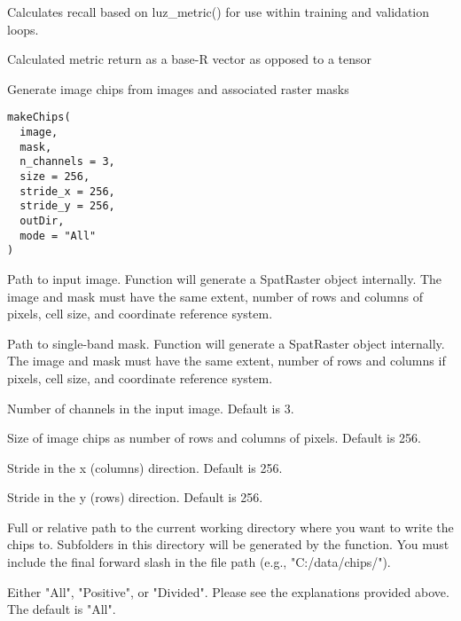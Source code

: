 \documentclass[a4paper]{book}
\begin{document}
%
\begin{Details}\relax
Calculates recall based on luz\_metric() for use within training and validation
loops.
\end{Details}
%
\begin{Value}
Calculated metric return as a base-R vector as opposed to a tensor
\end{Value}
%
\begin{Description}\relax
Generate image chips from images and associated raster masks
\end{Description}
%
\begin{Usage}
\begin{verbatim}
makeChips(
  image,
  mask,
  n_channels = 3,
  size = 256,
  stride_x = 256,
  stride_y = 256,
  outDir,
  mode = "All"
)
\end{verbatim}
\end{Usage}
%
\begin{Arguments}
\begin{ldescription}
\item[\code{image}] Path to input image. Function will generate a SpatRaster object
internally. The image and mask must have the same extent, number of rows and
columns of pixels, cell size, and coordinate reference system.

\item[\code{mask}] Path to single-band mask. Function will generate a SpatRaster
object internally. The image and mask must have the same extent, number of
rows and columns if pixels, cell size, and coordinate reference system.

\item[\code{n\_channels}] Number of channels in the input image. Default is 3.

\item[\code{size}] Size of image chips as number of rows and columns of pixels.
Default is 256.

\item[\code{stride\_x}] Stride in the x (columns) direction. Default is 256.

\item[\code{stride\_y}] Stride in the y (rows) direction. Default is 256.

\item[\code{outDir}] Full or relative path to the current working directory where you
want to write the chips to. Subfolders in this directory will be generated by
the function. You must include the final forward slash in the file path
(e.g., "C:/data/chips/").

\item[\code{mode}] Either "All", "Positive", or "Divided". Please see the explanations
provided above. The default is "All".
\end{ldescription}
\end{Arguments}
\end{document}
